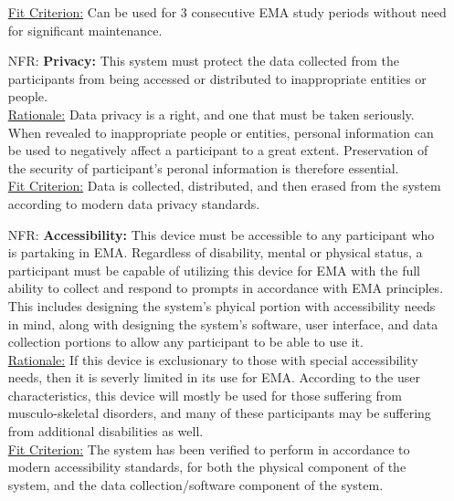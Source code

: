 \documentclass[12pt]{article}
\newcounter{nfrnum} %
\begin{document}
\begin{itemize}
\underline{Fit Criterion:} Can be used for 3 consecutive EMA study periods without need for significant maintenance.\\

\item[NFR\refstepcounter{nfrnum}\thenfrnum \label{NFR8}:]
  \textbf{Privacy:} This system must protect the data collected from the participants from being accessed or distributed to inappropriate entities or people. \\


\underline{Rationale:} Data privacy is a right, and one that must be taken seriously. When revealed to inappropriate people or entities, personal information can be used to negatively affect a participant to a great extent. Preservation of the security of participant's peronal information is therefore essential.\\

\underline{Fit Criterion:} Data is collected, distributed, and then erased from the system according to modern data privacy standards.\\

\item[NFR\refstepcounter{nfrnum}\thenfrnum \label{NFR9}:]
  \textbf{Accessibility:} This device must be accessible to any participant who is partaking in EMA. Regardless of disability, mental or physical status, a participant must be capable of utilizing this device for EMA with the full ability to collect and respond to prompts in accordance with EMA principles. This includes designing the system's phyical portion with accessibility needs in mind, along with designing the system's software, user interface, and data collection portions to allow any participant to be able to use it.\\

\underline{Rationale:} If this device is exclusionary to those with special accessibility needs, then it is severly limited in its use for EMA. According to the user characteristics, this device will mostly be used for those suffering from musculo-skeletal disorders, and many of these participants may be suffering from additional disabilities as well.\\

\underline{Fit Criterion:} The system has been verified to perform in accordance to modern accessibility standards, for both the physical component of the system, and the data collection/software component of the system.\\


\end{itemize}
\end{document}
